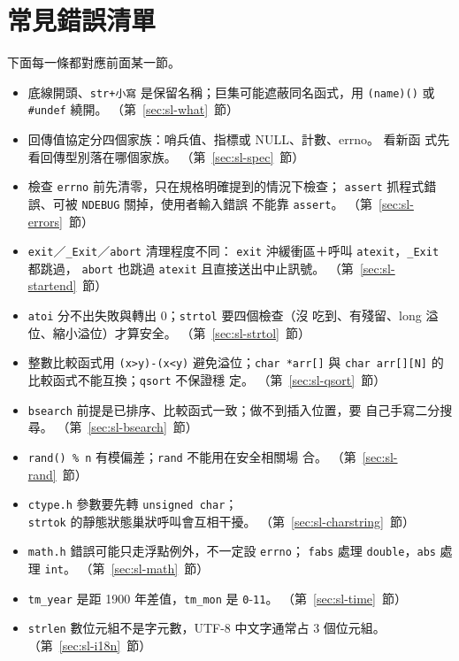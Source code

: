 \section{常見錯誤清單}
\label{sec:sl-checklist}

下面每一條都對應前面某一節。

\begin{itemize}
\item 底線開頭、\texttt{str+小寫} 是保留名稱；巨集可能遮蔽同名函式，用
\texttt{(name)()} 或 \texttt{\#undef} 繞開。
（第~\ref{sec:sl-what}~節）
\item 回傳值協定分四個家族：哨兵值、指標或 NULL、計數、errno。 看新函
式先看回傳型別落在哪個家族。
（第~\ref{sec:sl-spec}~節）
\item 檢查 \texttt{errno} 前先清零，只在規格明確提到的情況下檢查；
\texttt{assert} 抓程式錯誤、可被 \texttt{NDEBUG} 關掉，使用者輸入錯誤
不能靠 \texttt{assert}。
（第~\ref{sec:sl-errors}~節）
\item \texttt{exit}／\texttt{\_Exit}／\texttt{abort} 清理程度不同：
\texttt{exit} 沖緩衝區＋呼叫 \texttt{atexit}，\texttt{\_Exit} 都跳過，
\texttt{abort} 也跳過 \texttt{atexit} 且直接送出中止訊號。
（第~\ref{sec:sl-startend}~節）
\item \texttt{atoi} 分不出失敗與轉出 0；\texttt{strtol} 要四個檢查（沒
吃到、有殘留、long 溢位、縮小溢位）才算安全。
（第~\ref{sec:sl-strtol}~節）
\item 整數比較函式用 \texttt{(x>y)-(x<y)} 避免溢位；\texttt{char *arr[]}
與 \texttt{char arr[][N]} 的比較函式不能互換；\texttt{qsort} 不保證穩
定。
（第~\ref{sec:sl-qsort}~節）
\item \texttt{bsearch} 前提是已排序、比較函式一致；做不到插入位置，要
自己手寫二分搜尋。
（第~\ref{sec:sl-bsearch}~節）
\item \texttt{rand() \% n} 有模偏差；\texttt{rand} 不能用在安全相關場
合。
（第~\ref{sec:sl-rand}~節）
\item \texttt{ctype.h} 參數要先轉 \texttt{unsigned char}；\\
\texttt{strtok} 的靜態狀態巢狀呼叫會互相干擾。
（第~\ref{sec:sl-charstring}~節）
\item \texttt{math.h} 錯誤可能只走浮點例外，不一定設 \texttt{errno}；
\texttt{fabs} 處理 \texttt{double}，\texttt{abs} 處理 \texttt{int}。
（第~\ref{sec:sl-math}~節）
\item \texttt{tm\_year} 是距 1900 年差值，\texttt{tm\_mon} 是
\texttt{0}-\texttt{11}。
（第~\ref{sec:sl-time}~節）
\item \texttt{strlen} 數位元組不是字元數，UTF-8 中文字通常占 3 個位元組。\\
（第~\ref{sec:sl-i18n}~節）
\end{itemize}

